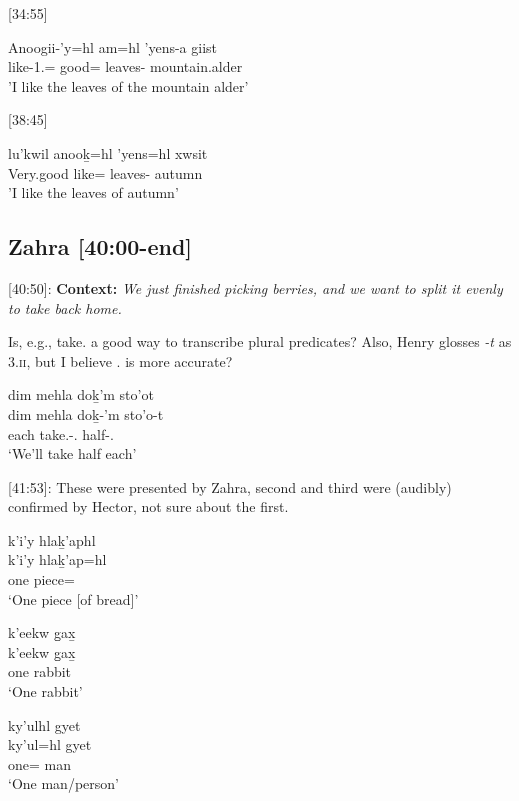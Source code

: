 [34:55]
\begin{exe}
\ex \gll Anoogii-'y=hl am=hl 'yens-a giist\\
like-1.\Ii{}=\Cn{} good=\Cn{} leaves-\Attr{} mountain.alder\\
'I like the leaves of the mountain alder'
\end{exe}

[38:45]
\begin{exe}
\ex \gll lu'kwil anooḵ=hl 'yens=hl xwsit\\
Very.good like=\Cn{} leaves-\Cn{} autumn\\
'I like the leaves of autumn'
\end{exe}


\subsection{Zahra [40:00-end]}

[40:50]: \textbf{Context:} \textit{We just finished picking berries, and we want to split it evenly to take back home.} 

Is, e.g., take.\Pl{} a good way to transcribe plural predicates? Also, Henry glosses \textit{-t} as \textsc{3.ii}, but I believe \Tsg{}.\Ii{} is more accurate?

\begin{exe}
    \ex \glll dim mehla doḵ'm sto'ot \\
    dim mehla doḵ-'m sto'o-t \\
    \Prosp{} each take.\Pl{}-\Fpl{}.\Ii{} half-\Tsg{}.\Ii{}\\
    `We'll take half each'
\end{exe}

[41:53]: These were presented by Zahra, second and third were (audibly) confirmed by Hector, not sure about the first.

\begin{exe}
    \ex 
    \begin{xlist}
    \item \glll k'i'y hlaḵ'aphl  \\
    k'i'y hlaḵ'ap=hl \\
    one piece=\Cn{}\\
    `One piece [of bread]'
    
    \item \glll k'eekw g̱ax̱   \\
    k'eekw g̱ax̱ \\
    one rabbit \\
    `One rabbit'

    \item \glll ky'ulhl gyet   \\
    ky'ul=hl gyet \\
    one=\Cn{} man \\
    `One man/person'
    \end{xlist}
\end{exe}

